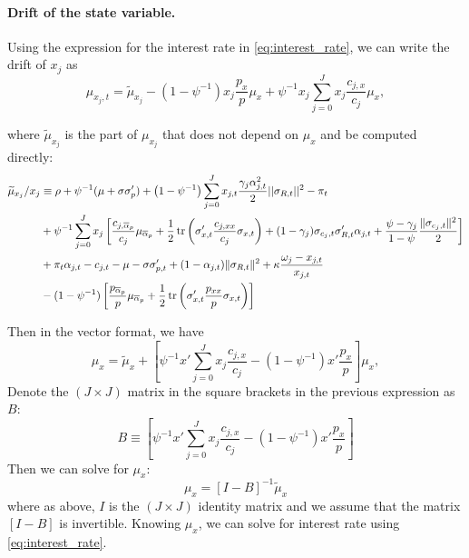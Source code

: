 \paragraph{Drift of the state variable.}

Using the expression for the interest rate in \eqref{eq:interest_rate}, we can write the drift of $ x_j $ as 
\begin{equation}\label{eq:mu_xj}
	\mu_{x_j,t}=\widetilde{\mu}_{x_j}-\left(1-\psi^{-1}\right)x_j\frac{p_x}{p}\mu_x+\psi^{-1}x_j\sum_{j=0}^{J}x_j\frac{c_{j,x}}{c_j}\mu_x,
\end{equation}

where $ \widetilde{\mu}_{x_j} $ is the part of $ \mu_{x_j} $ that does not depend on $ \mu_x $ and be computed directly:
\begin{align*}
	\widetilde{\mu}_{x_j}/x_j&\equiv \rho+\psi^{-1}(\mu+\sigma\sigma_p')+ \left (1-\psi^{-1}\right )  \sum_{j=0}^J x_{j,t}\frac{\gamma_j \alpha_{j,t}^2}{2} ||\sigma_{R,t}||^2- \pi_t\nonumber\\
	& +\psi^{-1}\sum_{j=0}^Jx_j\left[\frac{c_{j,\overline{\alpha}_p}}{c_j}\mu_{\overline{\alpha}_p}+\frac{1}{2}\operatorname{tr}\left(\sigma_{x,t}'\frac{c_{j,xx}}{c_j}\sigma_{x,t}\right)+ (1-\gamma_j)  \sigma_{c_j,t} \sigma_{R,t}' \alpha_{j,t} + \frac{\psi - \gamma_j}{1-\psi} \frac{\|\sigma_{c_j,t}\|^2}{2}\right]\nonumber\\
	&+ \pi_t \alpha_{j,t} - c_{j,t} -\mu - \sigma \sigma_{p,t}'  +(1- \alpha_{j,t}) \|\sigma_{R,t}\|^2  +\kappa \frac{\omega_j-x_{j,t}}{x_{j,t}} \nonumber\\
	&-(1-\psi^{-1})\left[\frac{p_{\overline{\alpha}_p}}{p}\mu_{\overline{\alpha}_p}+\frac{1}{2}\operatorname{tr}\left(\sigma_{x,t}'\frac{p_{xx}}{p}\sigma_{x,t}\right)\right]
\end{align*}

Then in the vector format, we have
\begin{equation}\label{eq:mux}
	\mu_x=\widetilde{\mu}_x+\left[\psi^{-1}x'\sum_{j=0}^{J}x_j\frac{c_{j,x}}{c_j}-\left(1-\psi^{-1}\right)x'\frac{p_x}{p}\right]\mu_x,
\end{equation}
Denote the $ (J\times J) $ matrix in the square brackets in the previous expression as $ B $:
\begin{equation}\label{key}
	B\equiv\left[\psi^{-1}x'\sum_{j=0}^{J}x_j\frac{c_{j,x}}{c_j}-\left(1-\psi^{-1}\right)x'\frac{p_x}{p}\right]
\end{equation}
Then we can solve for $ \mu_x $:
\begin{equation}\label{eq:mux2}
	\mu_x=\left[I-B\right]^{-1}\widetilde{\mu}_x
\end{equation}
where as above, $ I $ is the $ (J\times J) $ identity matrix and we assume that the matrix $\left[I-B\right]$ is invertible.
Knowing $ \mu_x $, we can solve for interest rate using \eqref{eq:interest_rate}.

